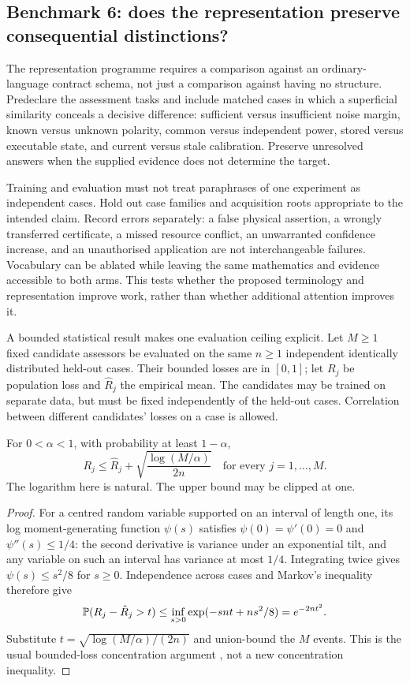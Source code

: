 \subsection{Benchmark 6: does the representation preserve consequential distinctions?}\label{sec:reprbench}
The representation programme requires a comparison against an ordinary-language contract schema, not just a comparison against having no structure. Predeclare the assessment tasks and include matched cases in which a superficial similarity conceals a decisive difference: sufficient versus insufficient noise margin, known versus unknown polarity, common versus independent power, stored versus executable state, and current versus stale calibration. Preserve unresolved answers when the supplied evidence does not determine the target.

Training and evaluation must not treat paraphrases of one experiment as independent cases. Hold out case families and acquisition roots appropriate to the intended claim. Record errors separately: a false physical assertion, a wrongly transferred certificate, a missed resource conflict, an unwarranted confidence increase, and an unauthorised application are not interchangeable failures. Vocabulary can be ablated while leaving the same mathematics and evidence accessible to both arms. This tests whether the proposed terminology and representation improve work, rather than whether additional attention improves it.

A bounded statistical result makes one evaluation ceiling explicit. Let $M\geq1$ fixed candidate assessors be evaluated on the same $n\geq1$ independent identically distributed held-out cases. Their bounded losses are in $[0,1]$; let $R_j$ be population loss and $\hat R_j$ the empirical mean. The candidates may be trained on separate data, but must be fixed independently of the held-out cases. Correlation between different candidates' losses on a case is allowed.

\begin{proposition}\label{prop:heldout}
For $0<\alpha<1$, with probability at least $1-\alpha$,
\begin{equation}\label{eq:heldout}
 R_j\leq\hat R_j+\sqrt{\frac{\log(M/\alpha)}{2n}}
 \quad\text{for every }j=1,\ldots,M.
\end{equation}
The logarithm here is natural. The upper bound may be clipped at one.
\end{proposition}
\begin{proof}
For a centred random variable supported on an interval of length one, its log moment-generating function $\psi(s)$ satisfies $\psi(0)=\psi'(0)=0$ and $\psi''(s)\leq1/4$: the second derivative is variance under an exponential tilt, and any variable on such an interval has variance at most $1/4$. Integrating twice gives $\psi(s)\leq s^2/8$ for $s\geq0$. Independence across cases and Markov's inequality therefore give
\[
 \mathbb{P}(R_j-\hat R_j>t)\leq
 \inf_{s>0}\exp(-snt+ns^2/8)=e^{-2nt^2}.
\]
Substitute $t=\sqrt{\log(M/\alpha)/(2n)}$ and union-bound the $M$ events. This is the usual bounded-loss concentration argument \citep{hoeffding}, not a new concentration inequality.
\end{proof}

